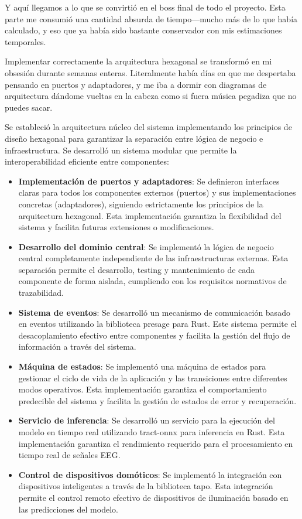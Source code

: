 Y aquí llegamos a lo que se convirtió en el boss final de todo el proyecto. Esta parte me consumió una cantidad absurda de tiempo—mucho más de lo que había calculado, y eso que ya había sido bastante conservador con mis estimaciones temporales. 

Implementar correctamente la arquitectura hexagonal se transformó en mi obsesión durante semanas enteras. Literalmente había días en que me despertaba pensando en puertos y adaptadores, y me iba a dormir con diagramas de arquitectura dándome vueltas en la cabeza como si fuera música pegadiza que no puedes sacar.

Se estableció la arquitectura núcleo del sistema implementando los principios de diseño hexagonal para garantizar la separación entre lógica de negocio e infraestructura. Se desarrolló un sistema modular que permite la interoperabilidad eficiente entre componentes:

\begin{itemize}
    \item \textbf{Implementación de puertos y adaptadores}: Se definieron interfaces claras para todos los componentes externos (puertos) y sus implementaciones concretas (adaptadores), siguiendo estrictamente los principios de la arquitectura hexagonal. Esta implementación garantiza la flexibilidad del sistema y facilita futuras extensiones o modificaciones.
    
    \item \textbf{Desarrollo del dominio central}: Se implementó la lógica de negocio central completamente independiente de las infraestructuras externas. Esta separación permite el desarrollo, testing y mantenimiento de cada componente de forma aislada, cumpliendo con los requisitos normativos de trazabilidad.
    
    \item \textbf{Sistema de eventos}: Se desarrolló un mecanismo de comunicación basado en eventos utilizando la biblioteca presage para Rust. Este sistema permite el desacoplamiento efectivo entre componentes y facilita la gestión del flujo de información a través del sistema.
    
    \item \textbf{Máquina de estados}: Se implementó una máquina de estados para gestionar el ciclo de vida de la aplicación y las transiciones entre diferentes modos operativos. Esta implementación garantiza el comportamiento predecible del sistema y facilita la gestión de estados de error y recuperación.
    
    \item \textbf{Servicio de inferencia}: Se desarrolló un servicio para la ejecución del modelo en tiempo real utilizando tract-onnx para inferencia en Rust. Esta implementación garantiza el rendimiento requerido para el procesamiento en tiempo real de señales EEG.
    
    \item \textbf{Control de dispositivos domóticos}: Se implementó la integración con dispositivos inteligentes a través de la biblioteca tapo. Esta integración permite el control remoto efectivo de dispositivos de iluminación basado en las predicciones del modelo.
\end{itemize}

